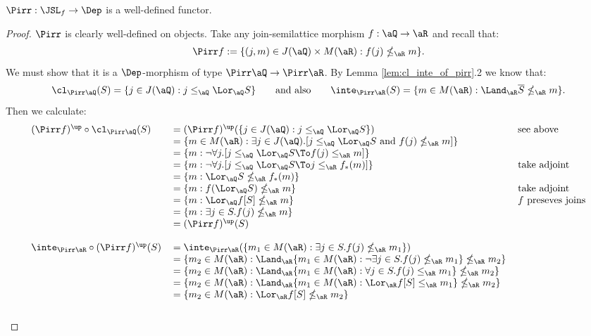 \documentclass{article}
\begin{document}
\begin{lemma}
\label{lem:pirr_well_defined}
$\Pirr : \JSL_f \to \Dep$ is a well-defined functor.
\end{lemma}

\begin{proof}
$\Pirr$ is clearly well-defined on objects. Take any join-semilattice morphism $f : \aQ \to \aR$ and recall that:
\[
\Pirr f := \{ (j,m) \in J(\aQ) \times M(\aR) : f(j) \nleq_\aR m \}.
\]
We must show that it is a $\Dep$-morphism of type $\Pirr\aQ \to \Pirr\aR$. By Lemma \ref{lem:cl_inte_of_pirr}.2 we know that:
\[
\cl_{\Pirr\aQ} (S) = \{ j \in J(\aQ) : j \leq_\aQ \Lor_\aQ S \}
\qquad\text{and also}\qquad
\inte_{\Pirr\aR} (S) = \{ m \in M(\aR) : \Land_\aR \overline{S} \nleq_\aR m \}.
\]
Then we calculate:
\[
\begin{tabular}{lll}
$(\Pirr f)^\up \circ \cl_{\Pirr\aQ}(S)$
&
$= (\Pirr f)^\up (\{ j \in J(\aQ) : j \leq_\aQ \Lor_\aQ S \})$
& see above
\\&
$= \{ m \in M(\aR) : \exists j \in J(\aQ).[ j \leq_\aQ \Lor_\aQ S \text{ and } f(j) \nleq_\aR m  ] \}$
\\&
$= \{ m  : \neg\forall j.[ j \leq_\aQ \Lor_\aQ S \To f(j) \leq_\aR m  ] \} $
\\&
$= \{ m : \neg\forall j.[ j \leq_\aQ \Lor_\aQ S \To j \leq_\aR f_*(m)  ] \}$
& take adjoint
\\&
$= \{ m : \Lor_\aQ S \nleq_\aR f_*(m) \}$
\\&
$= \{ m : f(\Lor_\aQ S) \nleq_\aR m \}$
& take adjoint
\\&
$= \{ m : \Lor_\aQ f[S] \nleq_\aR m \}$
& $f$ preseves joins
\\&
$= \{ m  : \exists j \in S. f(j) \nleq_\aR m \}$
\\&
$= (\Pirr f)^\up(S)$
\\
\\
$\inte_{\Pirr\aR} \circ (\Pirr f)^\up (S)$
&
$= \inte_{\Pirr\aR}(\{ m_1 \in M(\aR) : \exists j \in S. f(j) \nleq_\aR m_1 \})$
\\&
$= \{ m_2 \in M(\aR) : \Land_\aR \{ m_1 \in M(\aR) : \neg\exists j \in S. f(j) \nleq_\aR m_1 \} \nleq_\aR m_2 \}$
\\&
$= \{ m_2 \in M(\aR) : \Land_\aR \{ m_1 \in M(\aR) : \forall j \in S. f(j) \leq_\aR m_1 \} \nleq_\aR m_2  \}$
\\&
$= \{ m_2 \in M(\aR) : \Land_\aR \{ m_1 \in M(\aR) : \Lor_\aR f[S] \leq_\aR m_1 \} \nleq_\aR m_2  \}$
\\&
$= \{ m_2 \in M(\aR) : \Lor_\aR f[S]  \nleq_\aR m_2  \}$
\\&

\end{tabular}\]
\end{proof}
\end{document}
